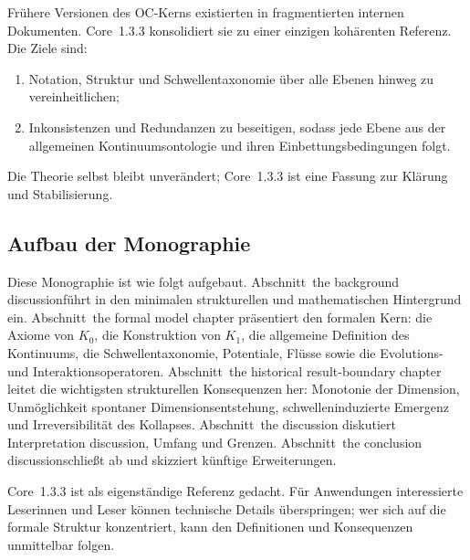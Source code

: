 Frühere Versionen des OC-Kerns existierten in fragmentierten internen Dokumenten. Core~1.3.3 konsolidiert sie zu einer einzigen kohärenten Referenz. Die Ziele sind:

\begin{enumerate}
    \item Notation, Struktur und Schwellentaxonomie über alle Ebenen hinweg zu vereinheitlichen;
    \item Inkonsistenzen und Redundanzen zu beseitigen, sodass jede Ebene aus der allgemeinen Kontinuumsontologie und ihren Einbettungsbedingungen folgt.
\end{enumerate}

Die Theorie selbst bleibt unverändert; Core~1.3.3 ist eine Fassung zur Klärung und Stabilisierung.

\subsection{Aufbau der Monographie}

Diese Monographie ist wie folgt aufgebaut.
Abschnitt~the background discussionführt in den minimalen strukturellen und mathematischen Hintergrund ein.
Abschnitt~the formal model chapter präsentiert den formalen Kern: die Axiome von \(K_0\), die Konstruktion von \(K_1\), die allgemeine Definition des Kontinuums, die Schwellentaxonomie, Potentiale, Flüsse sowie die Evolutions- und Interaktionsoperatoren.
Abschnitt~the historical result-boundary chapter leitet die wichtigsten strukturellen Konsequenzen her: Monotonie der Dimension, Unmöglichkeit spontaner Dimensionsentstehung, schwelleninduzierte Emergenz und Irreversibilität des Kollapses.
Abschnitt~the discussion diskutiert Interpretation discussion, Umfang und Grenzen.
Abschnitt~the conclusion discussionschließt ab und skizziert künftige Erweiterungen.

Core~1.3.3 ist als eigenständige Referenz gedacht. Für Anwendungen interessierte Leserinnen und Leser können technische Details überspringen; wer sich auf die formale Struktur konzentriert, kann den Definitionen und Konsequenzen unmittelbar folgen.
